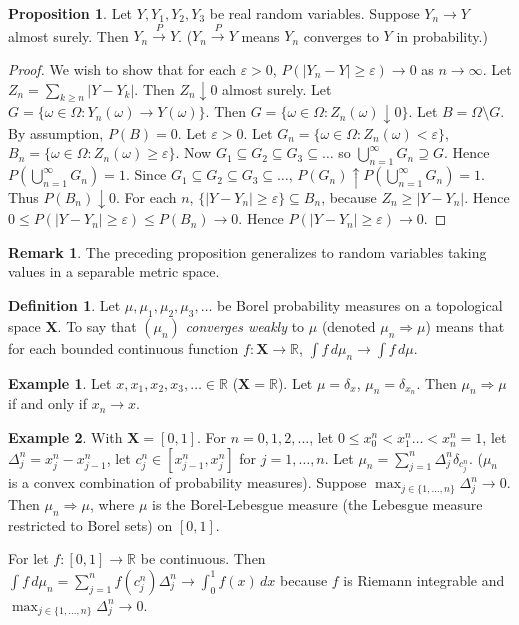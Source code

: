 \documentclass{article}
\newcommand{\R}{\mathbb{R}}
\theoremstyle{definition}
\newtheorem{proposition}[theorem]{Proposition}
\newtheorem*{example}{Example}
\newtheorem*{definition}{Definition}
\newtheorem*{remark}{Remark}
\begin{document}
\begin{proposition}
    Let $Y, Y_1, Y_2, Y_3$ be real random variables. Suppose $Y_n \to Y$ almost surely. Then $Y_n \xrightarrow{P} Y$. ($Y_n \xrightarrow{P} Y$ means $Y_n$ converges to $Y$ in probability.)
\end{proposition}
\begin{proof}
    We wish to show that for each $\varepsilon > 0$, $P(|Y_n - Y| \geq \varepsilon) \to 0$ as $n \to \infty$. Let $Z_n = \sum_{k \geq n} |Y - Y_k|$. Then $Z_n \downarrow 0$ almost surely. Let $G = \{\omega \in \Omega : Y_n(\omega) \to Y(\omega)\}$. Then $G = \{\omega \in \Omega : Z_n(\omega) \downarrow 0\}$. Let $B = \Omega \setminus G$. By assumption, $P(B) = 0$. Let $\varepsilon > 0$. Let $G_n = \{\omega \in \Omega : Z_n(\omega) < \varepsilon\}$, $B_n = \{\omega \in \Omega : Z_n(\omega) \geq \varepsilon\}$. Now $G_1 \subseteq G_2 \subseteq G_3 \subseteq \dots$ so $\bigcup_{n=1}^\infty G_n \supseteq G$. Hence $P\left(\bigcup_{n=1}^\infty G_n \right) = 1$. Since $G_1 \subseteq G_2 \subseteq G_3 \subseteq \dots$, $P(G_n) \uparrow P\left(\bigcup_{n=1}^\infty G_n \right) = 1$. Thus $P(B_n) \downarrow 0$. For each $n$, $\{|Y - Y_n| \geq \varepsilon\} \subseteq B_n$, because $Z_n \geq |Y-Y_n|$. Hence $0 \leq P(|Y-Y_n| \geq \varepsilon) \leq P(B_n) \to 0$. Hence $P(|Y-Y_n| \geq \varepsilon) \to 0$.
\end{proof}
\begin{remark}
     The preceding proposition generalizes to random variables taking values in a separable metric space.
\end{remark}

\begin{definition}
    Let $\mu, \mu_1, \mu_2, \mu_3, \dots$ be Borel probability measures on a topological space $\mathbf{X}$. To say that $(\mu_n)$ \emph{converges weakly} to $\mu$ (denoted $\mu_n \Rightarrow \mu$) means that for each bounded continuous function $f : \mathbf{X} \to \R$, $\int f \,d\mu_n \to \int f\,d\mu$.
\end{definition}

\begin{example}
Let $x, x_1, x_2, x_3, \dots \in \R$ ($\mathbf{X} = \R$). Let $\mu = \delta_x$, $\mu_n = \delta_{x_n}$. Then $\mu_n \Rightarrow \mu$ if and only if $x_n \to x$.
\end{example}
\begin{example}
With $\mathbf{X} = [0,1]$. For $n = 0, 1, 2, \dots$, let $0 \leq x_0^n < x_1^n \dots < x_n^n = 1$, let $\Delta_j^n = x_j^n - x_{j-1}^n$, let $c^n_j \in [x^n_{j-1}, x^n_j]$ for $j = 1, \dots, n$. Let $\mu_n = \sum_{j=1}^n \Delta^n_j \delta_{c^n_j}$. ($\mu_n$ is a convex combination of probability measures). Suppose $\max_{j \in \{1, \dots, n\}} \Delta^n_j \to 0$. Then $\mu_n \Rightarrow \mu$, where $\mu$ is the Borel-Lebesgue measure (the Lebesgue measure restricted to Borel sets) on $[0,1]$.

For let $f : [0,1] \to \R$ be continuous. Then $\int f \,d\mu_n = \sum_{j=1}^n f(c_j^n) \Delta^n_j \to \int_0^1 f(x)\,dx$ because $f$ is Riemann integrable and $\max_{j \in \{1, \dots, n\}} \Delta^n_j \to 0$.
\end{example}
\end{document}

